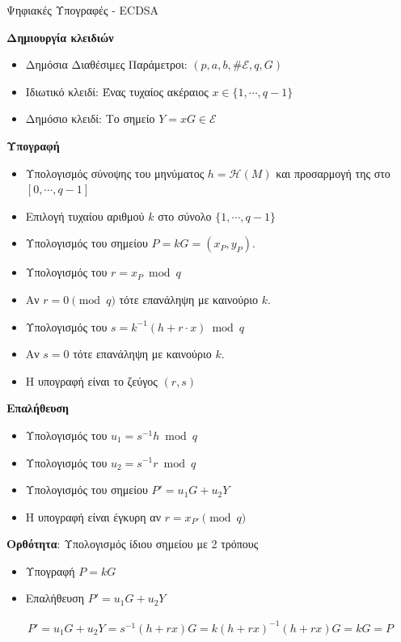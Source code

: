 \documentclass[handout]{beamer}
\begin{document}
\begin{frame}[allowframebreaks]{Ψηφιακές Υπογραφές - ECDSA}

\textbf{Δημιουργία κλειδιών }
\begin{itemize}
\item Δημόσια Διαθέσιμες Παράμετροι: $(p,a,b,\# \mathcal{E},q,G)$
\item Ιδιωτικό κλειδί: Ένας τυχαίος ακέραιος $x \in \{1, \cdots, q-1 \}$
\item Δημόσιο κλειδί: Το σημείο $Y=xG \in \mathcal{E}$
\end{itemize}

\framebreak

\textbf{Υπογραφή}
\begin{itemize}
\item Υπολογισμός σύνοψης του μηνύματος $h = \mathcal{H}(M)$ και προσαρμογή της στο $[ 0, \cdots, q-1 ]$
\item Επιλογή τυχαίου αριθμού $k$ στο σύνολο $\{ 1, \cdots, q-1 \}$
\item Υπολογισμός του σημείου $P=kG=(x_P,y_P)$.
\item Υπολογισμός του $r = x_P \bmod q$
\item \alert{Αν $r = 0 \pmod{q}$ τότε επανάληψη με καινούριο $k$}.
\item Υπολογισμός του $s = k^{-1} (h + r \cdot x) \bmod{q}$
\item \alert{Αν $s=0$ τότε επανάληψη με καινούριο $k$}.
\item Η υπογραφή είναι το ζεύγος $(r,s)$
\end{itemize}

\framebreak
\textbf{Επαλήθευση}
\begin{itemize}
\item Υπολογισμός του $u_1 = s^{-1} h \bmod{q}$
\item Υπολογισμός του $u_2 = s^{-1} r \bmod{q}$
\item Υπολογισμός του σημείου $P' = u_1 G + u_2 Y$
\item H υπογραφή είναι έγκυρη αν $r = x_{P' } \pmod{q}$ 
\end{itemize}

\medskip
\textbf{Ορθότητα}: Υπολογισμός ίδιου σημείου με 2 τρόπους
\begin{itemize}
\item Υπογραφή $P=kG$
\item Επαλήθευση $P' = u_1 G + u_2 Y $
\end{itemize}
\begin{align*}
P' = u_1 G + u_2 Y = s^{-1} (h+rx) G = k(h+rx)^{-1}(h+rx)G = kG = P
\end{align*}


\end{frame}
\end{document}
